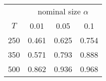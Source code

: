 % 

\renewcommand{\arraystretch}{1.2}
\begin{tabular}{cccc}
\hline
    & \multicolumn{3}{c}{nominal size $\alpha$} \\
$T$ & 0.01 & 0.05 & 0.1 \\ 
\hline
250 & 0.461 & 0.625 & 0.754 \\ 
350 & 0.571 & 0.793 & 0.888 \\ 
500 & 0.862 & 0.936 & 0.968 \\ 
\hline
\end{tabular}
